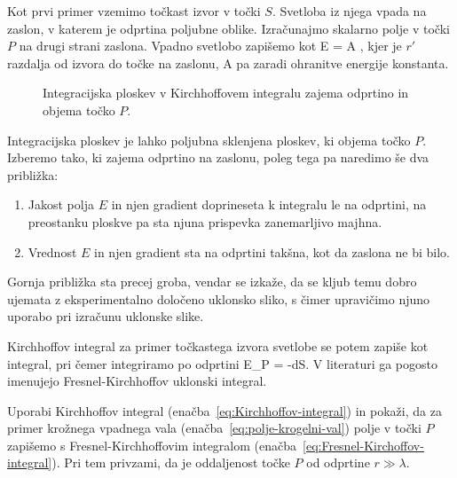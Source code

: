 Kot prvi primer vzemimo točkast izvor v točki $S$. Svetloba iz njega vpada na zaslon, 
v katerem je odprtina poljubne oblike. Izračunajmo skalarno polje v točki $P$ na drugi 
strani zaslona. Vpadno svetlobo zapišemo kot
\beq
\label{eq:polje-krogelni-val}
E = A ,
\eeq
kjer je $r'$ razdalja od izvora do točke na zaslonu, A pa zaradi ohranitve energije konstanta.

\begin{figure}[h]
\centering {} 
  
\caption{Integracijska ploskev v Kirchhoffovem integralu zajema odprtino in objema točko $P$.}
\label{fig:UklonFK}
\end{figure}

Integracijska ploskev je lahko poljubna sklenjena ploskev, ki objema točko $P$. Izberemo tako, ki
zajema odprtino na zaslonu, poleg tega pa naredimo še dva približka:\\
\begin{enumerate}
\item Jakost polja $E$ in njen gradient doprineseta k integralu le na odprtini, na preostanku ploskve
pa sta njuna prispevka zanemarljivo majhna.\\
\item Vrednost $E$ in njen gradient sta na odprtini takšna, kot da zaslona ne bi bilo.\\
\end{enumerate}
Gornja približka sta precej groba, vendar se izkaže, da se kljub temu
dobro ujemata z eksperimentalno določeno uklonsko sliko, s čimer 
upravičimo njuno uporabo pri izračunu uklonske slike.

Kirchhoffov integral za primer točkastega izvora svetlobe se potem zapiše kot integral, pri čemer
integriramo po odprtini
\beq
E_P = -\int{} dS.
\label{eq:Fresnel-Kirchoffov-integral}
\eeq
V literaturi ga pogosto imenujejo Fresnel-Kirchhoffov uklonski integral.
\begin{definition}
\label{naloga-Fresnel-Kirchhoff-uklon}
Uporabi Kirchhoffov integral (enačba~\ref{eq:Kirchhoffov-integral}) in pokaži, da za primer krožnega vpadnega vala
(enačba~\ref{eq:polje-krogelni-val}) polje v točki $P$ zapišemo s Fresnel-Kirchhoffovim integralom 
(enačba~\ref{eq:Fresnel-Kirchoffov-integral}). Pri tem privzami, da je oddaljenost točke $P$ od odprtine
$r \gg \lambda$.
\end{definition}

